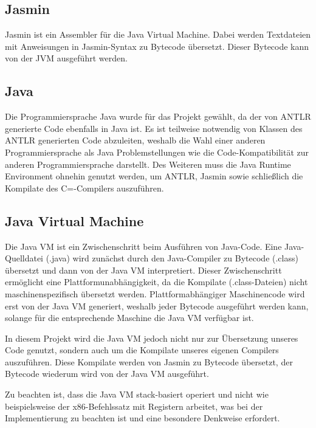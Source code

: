 \subsection{Jasmin}
Jasmin ist ein Assembler für die Java Virtual Machine. Dabei werden Textdateien mit Anweisungen in Jasmin-Syntax zu Bytecode übersetzt. Dieser Bytecode kann von der JVM ausgeführt werden.

\subsection{Java}
Die Programmiersprache Java wurde für das Projekt gewählt, da der von ANTLR generierte Code ebenfalls in Java ist. Es ist teilweise notwendig von Klassen des ANTLR generierten Code abzuleiten, weshalb die Wahl einer anderen Programmiersprache als Java Problemstellungen wie die Code-Kompatibilität zur anderen Programmiersprache darstellt. 
Des Weiteren muss die Java Runtime Environment ohnehin genutzt werden, um ANTLR, Jasmin sowie schließlich die Kompilate des C=-Compilers auszuführen.

\subsection{Java Virtual Machine}
Die Java VM ist ein Zwischenschritt beim Ausführen von Java-Code. Eine Java-Quelldatei (.java) wird zunächst durch den Java-Compiler zu Bytecode (.class) übersetzt und dann von der Java VM interpretiert. Dieser Zwischenschritt ermöglicht eine Plattformunabhängigkeit, da die Kompilate (.class-Dateien) nicht maschinenspezifisch übersetzt werden. Plattformabhängiger Maschinencode wird erst von der Java VM generiert, weshalb jeder Bytecode ausgeführt werden kann, solange für die entsprechende Maschine die Java VM verfügbar ist.

In diesem Projekt wird die Java VM jedoch nicht nur zur Übersetzung unseres Code genutzt, sondern auch um die Kompilate unseres eigenen Compilers auszuführen. Diese Kompilate werden von Jasmin zu Bytecode übersetzt, der Bytecode wiederum wird von der Java VM ausgeführt.


Zu beachten ist, dass die Java VM stack-basiert operiert und nicht wie beispielsweise der x86-Befehlssatz mit Registern arbeitet, was bei der Implementierung zu beachten ist und eine besondere Denkweise erfordert. 
